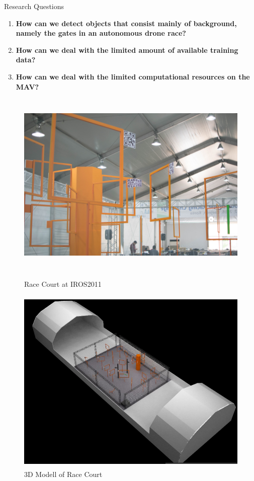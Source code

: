 \documentclass{beamer}
\begin{document}
\begin{frame}[fragile]
\begin{columns}[T]
\begin{column}{.45\textwidth}
	
	\begin{block}{Research Questions}
		
		\begin{enumerate}
			\item \textbf{How can we detect objects that consist mainly of background, namely the gates in an autonomous drone race?}
			\item \textbf{How can we deal with the limited amount of available training data?}
			\item \textbf{How can we deal with the limited computational resources on the MAV?}
		\end{enumerate}
		
		
	\end{block}
\begin{figure}
	
	\begin{minipage}{0.4\textwidth}
		\centering
		\includegraphics[height=9cm]{fig/iros-pic11}
		\caption{Race Court at IROS2011}
	\end{minipage}
	\begin{minipage}{0.4\textwidth}
		\centering
		\includegraphics[height=9cm]{fig/court}
		\caption{3D Modell of Race Court}
	\end{minipage}
	\label{fig:angl-pr}
\end{figure}


\end{column}
\end{columns}
\end{frame}
\end{document}
